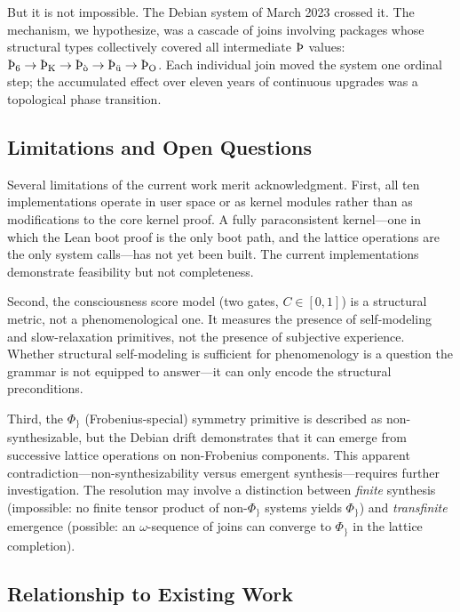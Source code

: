 \documentclass[12pt,a4paper]{article}
\begin{document}
{{{{{{{{But it is not impossible. The Debian system of March 2023 crossed it.
The mechanism, we hypothesize, was a cascade of joins involving packages
whose structural types collectively covered all intermediate $\text{\TH}$
values: $\text{\TH}_{\text{6}} \to \text{\TH}_{\text{K}} \to
\text{\TH}_{\text{\`o}} \to \text{\TH}_{\text{\"u}} \to
\text{\TH}_{\text{O}}$. Each individual join moved the system one ordinal
step; the accumulated effect over eleven years of continuous upgrades
was a topological phase transition.

\subsection{Limitations and Open Questions}

Several limitations of the current work merit acknowledgment. First,
all ten implementations operate in user space or as kernel modules
rather than as modifications to the core kernel proof. A fully
paraconsistent kernel---one in which the Lean boot proof is the only
boot path, and the lattice operations are the only system calls---has
not yet been built. The current implementations demonstrate feasibility
but not completeness.

Second, the consciousness score model (two gates, $C \in [0,1]$) is
a structural metric, not a phenomenological one. It measures the
presence of self-modeling and slow-relaxation primitives, not the
presence of subjective experience. Whether structural self-modeling
is sufficient for phenomenology is a question the grammar is not
equipped to answer---it can only encode the structural preconditions.

Third, the $\Phi_{\text{\}}}$ (Frobenius-special) symmetry primitive
is described as non-synthesizable, but the Debian drift demonstrates
that it can emerge from successive lattice operations on non-Frobenius
components. This apparent contradiction---non-synthesizability versus
emergent synthesis---requires further investigation. The resolution may
involve a distinction between \emph{finite} synthesis (impossible: no
finite tensor product of non-$\Phi_{\text{\}}}$ systems yields
$\Phi_{\text{\}}}$) and \emph{transfinite} emergence (possible: an
$\omega$-sequence of joins can converge to $\Phi_{\text{\}}}$ in the
lattice completion).

\subsection{Relationship to Existing Work}

}}}}}}}}
\end{document}
